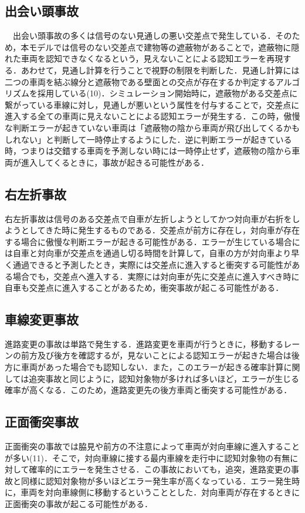 \documentclass[14pt,a4j]{jsarticle}
\begin{document}
\subsection{出会い頭事故}
　出会い頭事故の多くは信号のない見通しの悪い交差点で発生している．そのため，本モデルでは信号のない交差点で建物等の遮蔽物があることで，遮蔽物に隠れた車両を認知できなくなるという，見えないことによる認知エラーを再現する．あわせて，見通し計算を行うことで視野の制限を判断した．見通し計算には二つの車両を結ぶ線分と遮蔽物である壁面との交点が存在するか判定するアルゴリズムを採用している(10)．シミュレーション開始時に，遮蔽物がある交差点に繋がっている車線に対し，見通しが悪いという属性を付与することで，交差点に進入する全ての車両に見えないことによる認知エラーが発生する．この時，傲慢な判断エラーが起きていない車両は「遮蔽物の陰から車両が飛び出してくるかもしれない」と判断して一時停止するようにした．逆に判断エラーが起きている時，つまりは交錯する車両を予測しない時には一時停止せず，遮蔽物の陰から車両が進入してくるときに，事故が起きる可能性がある．
\subsection{右左折事故}
右左折事故は信号のある交差点で自車が左折しようとしてかつ対向車が右折をしようとしてきた時に発生するものである．交差点が前方に存在し，対向車が存在する場合に傲慢な判断エラーが起きる可能性がある．エラーが生じている場合には自車と対向車が交差点を通過し切る時間を計算して，自車の方が対向車より早く通過できると予測したとき，実際には交差点に進入すると衝突する可能性がある場合でも，交差点へ進入する．実際には対向車が先に交差点に進入すべき時に自車も交差点に進入することがあるため，衝突事故が起こる可能性がある．
\subsection{車線変更事故}
進路変更の事故は単路で発生する．進路変更を車両が行うときに，移動するレーンの前方及び後方を確認するが，見ないことによる認知エラーが起きた場合は後方に車両があった場合でも認知しない．また，このエラーが起きる確率計算に関しては追突事故と同じように，認知対象物が多ければ多いほど，エラーが生じる確率が高くなる．このため，進路変更先の後方車両と衝突する可能性がある．
\subsection{正面衝突事故}
正面衝突の事故では脇見や前方の不注意によって車両が対向車線に進入することが多い(11)．そこで，対向車線に接する最内車線を走行中に認知対象物の有無に対して確率的にエラーを発生させる．この事故においても，追突，進路変更の事故と同様に認知対象物が多いほどエラー発生率が高くなっている．エラー発生時に，車両を対向車線側に移動するということとした．対向車両が存在するときに正面衝突の事故が起こる可能性がある．
\end{document}
